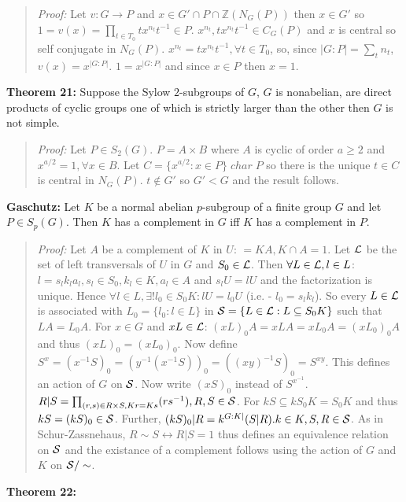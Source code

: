 \begin{quote}
\emph{Proof:}  
Let $v:G \rightarrow P$ and $x \in G' \cap P \cap {\mathbb Z}(N_G(P))$ then $x \in G'$ so
$1=v(x)=\prod_{t \in T_0} t x^{n_t} t^{-1} \in P$.  $x^{n_t} , t x^{n_t} t^{-1} \in C_G(P)$ and
$x$ is central so self conjugate in $N_G(P)$.  $x^{n_t}= t x^{n_t} t^{-1}, \forall t \in T_0$,
so, since $|G:P|= \sum_t n_t$, $v(x)= x^{|G:P|}$.  $1= x^{|G:P|}$ and since $x \in P$ then
$x=1$.
\end{quote}
{\bf Theorem 21:}
Suppose the Sylow $2$-subgroups of $G$, $G$ is nonabelian, are direct products of cyclic groups
one of which is strictly larger than the other then $G$ is not simple.
\begin{quote}
\emph{Proof:}  
Let $P \in S_2(G)$.  $P= A \times B$ where $A$ is cyclic of order $a \ge 2$ and
$x^{a/2}=1, \forall x \in B$.  Let $C= \{ x^{a/2}: x \in P \} \; char \; P$ so there is
the unique $t \in C$ is central in $N_G(P)$.  $t \notin G'$ so $G' < G$ and the result follows.
\end{quote}
{\bf Gaschutz:}  Let $K$ be a normal abelian $p$-subgroup of a finite group $G$ and let
$P \in S_p(G)$.  Then $K$ has a complement in $G$ iff $K$ has a complement in $P$.
\begin{quote}
\emph{Proof:}  
Let $A$ be a complement of $K$ in $U$: $=KA, K \cap A = 1$.  
Let ${\cal L}$ be the set of left transversals of $U$ in $G$ and $S_0 \in {\cal L}$.
Then $\forall L \in {\cal L}, l \in L$:
$l=s_l k_l a_l, s_l \in S_0, k_l \in K, a_l \in A$ and $s_l U = lU$ and the factorization is
unique.  Hence
$\forall l \in L, \exists! l_0 \in S_0 K: lU=l_0 U$ (i.e. - $l_0=s_l k_l$).  So every
$L \in {\cal L}$ is associated with $L_0 = \{ l_0 : l \in L \}$ in
${\cal S} = \{ L \in {\cal L}: L \subseteq S_0 K \}$ such that $LA= L_0 A$.  For $x \in G$ and
$xL \in {\cal L}$: $(xL)_0A = xLA = x L_0 A = (xL_0)_0 A$ and thus $(xL)_0 = (x L_0)_0$.
Now define $S^x= (x^{-1} S)_0 = (y^{-1} ( x^{-1} S))_0 = ((xy)^{-1} S)_0 = S^{xy}$.
This defines an action of $G$ on ${\cal S}$.  Now write $(xS)_0$ instead of $S^{x^{-1}}$.
$R|S= \prod_{(r,s) \in R \times S, Kr=Ks} (rs^{-1}), R, S \in {\cal S}$.  For
$kS \subseteq k S_0 K= S_0 K$ and thus $kS = (kS)_0 \in {\cal S}$.  Further,
$(kS)_0|R = k^{G:K|} (S|R). k \in K, S,R \in {\cal S}$.  As in Schur-Zassnehaus,
$R \sim S  \leftrightarrow R|S=1$ thus defines an equivalence relation on ${\cal S}$
and the existance of a complement follows using the action of $G$ and $K$ on ${\cal S}/ \sim$.
\end{quote}
{\bf Theorem 22:} 

